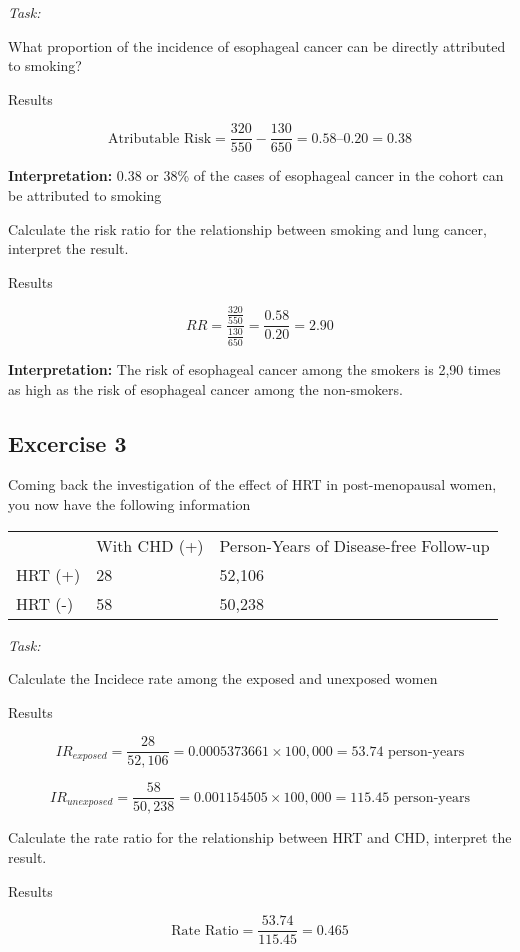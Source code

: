 \documentclass[
  14pt,
  letterpaper,
  DIV=11,
  numbers=noendperiod]{scrreprt}
\begin{document}
\emph{Task:}

What proportion of the incidence of esophageal cancer can be directly
attributed to smoking?

Results

\[
\text{Atributable Risk} = \frac{320}{550} - \frac{130}{650} =  0.58 – 0.20 = 0.38
\]

\textbf{Interpretation:} 0.38 or 38\% of the cases of esophageal cancer
in the cohort can be attributed to smoking

Calculate the risk ratio for the relationship between smoking and lung
cancer, interpret the result.

Results

\[
RR = \frac{\frac{320}{550}}{\frac{130}{650}} = \frac{0.58}{0.20} = 2.90
\]

\textbf{Interpretation:} The risk of esophageal cancer among the smokers
is 2,90 times as high as the risk of esophageal cancer among the
non-smokers.

\subsection{Excercise 3}\label{excercise-3}

Coming back the investigation of the effect of HRT in post-menopausal
women, you now have the following information

\begin{longtable}[]{@{}lll@{}}
\toprule\noalign{}
\endhead
\bottomrule\noalign{}
\endlastfoot
& With CHD (+) & Person-Years of Disease-free Follow-up \\
HRT (+) & 28 & 52,106 \\
HRT (-) & 58 & 50,238 \\
\end{longtable}

\emph{Task:}

Calculate the Incidece rate among the exposed and unexposed women

Results

\[
IR_{exposed}= \frac{28}{52,106} = 0.0005373661 \times 100,000 =  53.74 \text{ person-years}
\]

\[
IR_{unexposed}= \frac{58}{50,238} = 0.001154505 \times 100,000 = 115.45 \text{ person-years}
\]

Calculate the rate ratio for the relationship between HRT and CHD,
interpret the result.

Results

\[
\text{Rate Ratio}= \frac{53.74}{115.45}  = 0.465
\]
\end{document}
